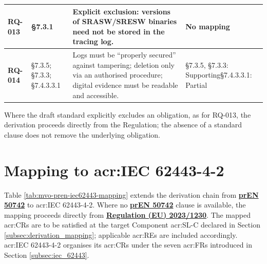 \begin{longtable}{|>{\bfseries}p{1cm}|p{2.5cm}|p{9cm}|>{\centering\arraybackslash}p{2cm}|}
	RQ-013 &
	\S7.3.1 &
	Explicit exclusion: versions of SRASW/SRESW binaries need not be stored in the tracing log. &
	No mapping \\
	\hline
	
	RQ-014 &
	\S7.3.5;  \newline \S7.3.3;  \newline \S7.4.3.3.1 &
	Logs must be ``properly secured'' against tampering; deletion only via an authorised procedure; digital evidence must be readable and accessible. &
	\S7.3.5, \S7.3.3: Supporting\newline\S7.4.3.3.1: Partial \\
	\hline
	
	
\end{longtable}

Where the draft standard explicitly excludes an obligation, as for RQ-013, the derivation proceeds directly from the Regulation; the absence of a standard clause does not remove the underlying obligation.


\section{Mapping to \gls{acr:IEC} 62443-4-2}
\label{app:sec:mapping_iec62443}
\normalsize
Table \ref{tab:mvo-pren-iec62443-mapping} extends the derivation chain from \hyperref[subsec:pren_50742]{\textbf{prEN 50742}} to \gls{acr:IEC} 62443-4-2. Where no \hyperref[subsec:pren_50742]{\textbf{prEN 50742}} clause is available, the mapping proceeds directly from \hyperref[subsec:eu_machinery_regulation]{\textbf{Regulation (EU) 2023/1230}}. The mapped \glspl{acr:CR} are to be satisfied at the target Component \gls{acr:SL-C} declared in Section \ref{subsec:derivation_mapping}; applicable \glspl{acr:RE} are included accordingly. \gls{acr:IEC} 62443-4-2 organises its \glspl{acr:CR} under the seven \glspl{acr:FR} introduced in Section \ref{subsec:iec_62443}.


